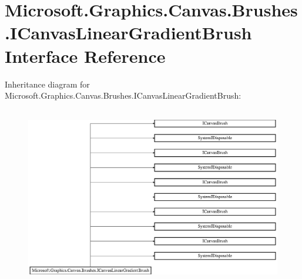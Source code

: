 \hypertarget{interface_microsoft_1_1_graphics_1_1_canvas_1_1_brushes_1_1_i_canvas_linear_gradient_brush}{}\section{Microsoft.\+Graphics.\+Canvas.\+Brushes.\+I\+Canvas\+Linear\+Gradient\+Brush Interface Reference}
\label{interface_microsoft_1_1_graphics_1_1_canvas_1_1_brushes_1_1_i_canvas_linear_gradient_brush}
Inheritance diagram for Microsoft.\+Graphics.\+Canvas.\+Brushes.\+I\+Canvas\+Linear\+Gradient\+Brush\+:\begin{figure}[H]
\begin{center}
\leavevmode
\includegraphics[height=7.857142cm]{interface_microsoft_1_1_graphics_1_1_canvas_1_1_brushes_1_1_i_canvas_linear_gradient_brush}
\end{center}
\end{figure}

